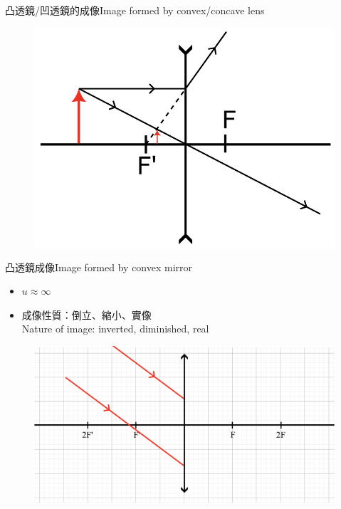 \documentclass[beamer=true]{standalone}
\begin{document}
\begin{frame}{凸透鏡/凹透鏡的成像Image formed by convex/concave lens}
    \begin{figure}
        \centering
        \includegraphics[width=0.75\linewidth]{assets/x1ni190necr4.png}


    \end{figure}

\end{frame}

\begin{frame}{凸透鏡成像Image formed by convex mirror}
    \begin{itemize}
        \item $u\approx\infty$
        \item 成像性質：倒立、縮小、實像
              \\Nature of image: inverted, diminished, real
    \end{itemize}
    \begin{figure}
        \centering
        \includegraphics[width=1\linewidth]{assets/dn320un2d39u.png}


    \end{figure}
\end{frame}
\end{document}
